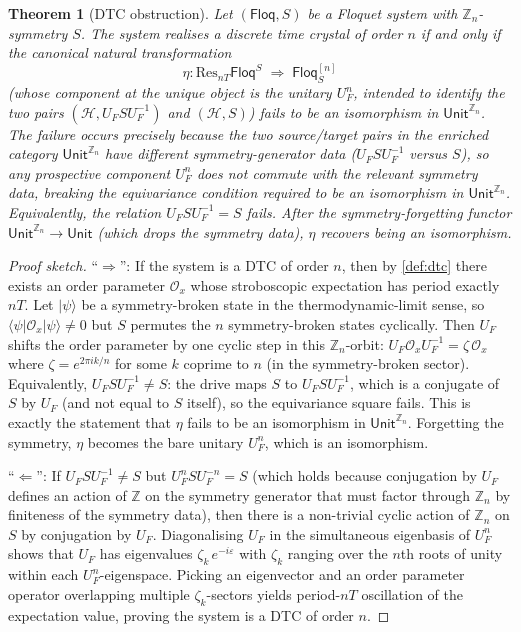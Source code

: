 \documentclass[12pt]{article}
\newtheorem{theorem}{Theorem}[section]
\theoremstyle{definition}
\theoremstyle{remark}
\newcommand{\Hcal}{\mathcal{H}}
\newcommand{\Z}{\mathbb{Z}}
\newcommand{\Floq}{\mathsf{Floq}}
\newcommand{\Res}{\mathrm{Res}}
\begin{document}
\begin{theorem}[DTC obstruction]
\label{thm:dtc-obstruction}
Let $(\Floq, S)$ be a Floquet system with $\Z_n$-symmetry $S$. The system realises a discrete time crystal of order $n$ if and only if the canonical natural transformation
\begin{equation}
\eta\colon \Res_{nT}\Floq^S \;\Longrightarrow\; \Floq^{[n]}_S
\end{equation}
(whose component at the unique object is the unitary $U_F^n$, intended to identify the two pairs $(\Hcal,U_F SU_F^{-1})$ and $(\Hcal,S)$) fails to be an isomorphism in $\mathsf{Unit}^{\Z_n}$. The failure occurs precisely because the two source/target pairs in the enriched category $\mathsf{Unit}^{\Z_n}$ have \emph{different} symmetry-generator data ($U_F SU_F^{-1}$ versus $S$), so any prospective component $U_F^n$ does not commute with the relevant symmetry data, breaking the equivariance condition required to be an isomorphism in $\mathsf{Unit}^{\Z_n}$. Equivalently, the relation $U_F S U_F^{-1} = S$ fails. After the symmetry-forgetting functor $\mathsf{Unit}^{\Z_n}\to\mathsf{Unit}$ (which drops the symmetry data), $\eta$ recovers being an isomorphism.
\end{theorem}

\begin{proof}[Proof sketch]
``$\Rightarrow$'': If the system is a DTC of order $n$, then by \cref{def:dtc} there exists an order parameter $\mathcal{O}_x$ whose stroboscopic expectation has period exactly $nT$. Let $|\psi\rangle$ be a symmetry-broken state in the thermodynamic-limit sense, so $\langle\psi|\mathcal{O}_x|\psi\rangle\neq 0$ but $S$ permutes the $n$ symmetry-broken states cyclically. Then $U_F$ shifts the order parameter by one cyclic step in this $\Z_n$-orbit: $U_F\mathcal{O}_x U_F^{-1}=\zeta\,\mathcal{O}_x$ where $\zeta=e^{2\pi i k/n}$ for some $k$ coprime to $n$ (in the symmetry-broken sector). Equivalently, $U_F S U_F^{-1}\neq S$: the drive maps $S$ to $U_F S U_F^{-1}$, which is a conjugate of $S$ by $U_F$ (and not equal to $S$ itself), so the equivariance square fails. This is exactly the statement that $\eta$ fails to be an isomorphism in $\mathsf{Unit}^{\Z_n}$. Forgetting the symmetry, $\eta$ becomes the bare unitary $U_F^n$, which is an isomorphism.

``$\Leftarrow$'': If $U_F S U_F^{-1}\neq S$ but $U_F^n S U_F^{-n}=S$ (which holds because conjugation by $U_F$ defines an action of $\Z$ on the symmetry generator that must factor through $\Z_n$ by finiteness of the symmetry data), then there is a non-trivial cyclic action of $\Z_n$ on $S$ by conjugation by $U_F$. Diagonalising $U_F$ in the simultaneous eigenbasis of $U_F^n$ shows that $U_F$ has eigenvalues $\zeta_k\,e^{-i\varepsilon}$ with $\zeta_k$ ranging over the $n$th roots of unity within each $U_F^n$-eigenspace. Picking an eigenvector and an order parameter operator overlapping multiple $\zeta_k$-sectors yields period-$nT$ oscillation of the expectation value, proving the system is a DTC of order $n$.
\end{proof}
\end{document}
